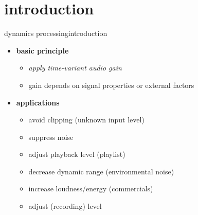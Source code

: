 


\subtitle{Part 21: Dynamics Processing}


	

\section[intro]{introduction}
\begin{frame}{dynamics processing}{introduction}
	\begin{itemize}
		\item	\textbf{basic principle}
			\begin{itemize}
				\item	\textit{apply time-variant audio gain} 
                \item   gain depends on signal properties or external factors
			\end{itemize}
		\pause
        \bigskip
		\item	\textbf{applications}
			\begin{itemize}
				\item	avoid clipping (unknown input level)
				\item	suppress noise
				\item	adjust playback level (playlist)
				\item	decrease dynamic range (environmental noise)
				\item	increase loudness/energy (commercials)
				\item	adjust (recording) level
			\end{itemize}
	\end{itemize}
\end{frame}
